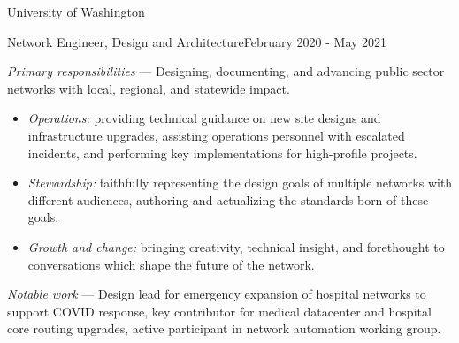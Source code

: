 \documentclass[10pt]{article}
\newenvironment{employer_set}[1]{\newcommand{\employer}[0]{{#1}}}{}
\newenvironment{title_itemize}[2]
{
	\noindent{}\textbf{\employer{}}\hfill{}{#2}\\
	\noindent{#1}

	\begin{itemize}[leftmargin=2em, labelindent=\parindent]
}
{
	\end{itemize}
}
\begin{document}
\begin{employer_set}{University of Washington}
	\begin{title_itemize}{Network Engineer, Design and Architecture}{February 2020 - May 2021}
		\item{}\emph{Primary responsibilities} --- Designing, documenting, and advancing public sector networks with local, regional, and statewide impact.
		\begin{itemize}
			\item{}\emph{Operations:} providing technical guidance on new site designs and infrastructure upgrades, assisting operations personnel with escalated incidents, and performing key implementations for high-profile projects.
			\item{}\emph{Stewardship:} faithfully representing the design goals of multiple networks with different audiences, authoring and actualizing the standards born of these goals.
			\item{}\emph{Growth and change:} bringing creativity, technical insight, and forethought to conversations which shape the future of the network.
		\end{itemize}
	\item{}\emph{Notable work} --- Design lead for emergency expansion of hospital networks to support COVID response, key contributor for medical datacenter and hospital core routing upgrades, active participant in network automation working group.
	\end{title_itemize}
\end{employer_set}
\end{document}
